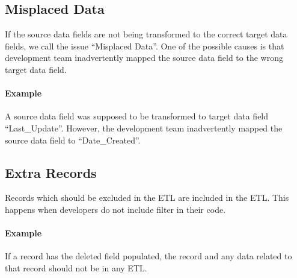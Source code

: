 
\subsection*{Misplaced Data}

If the source data fields are not being transformed to the correct target data fields, we call the issue \enquote{Misplaced Data}.
One of the possible causes is that development team inadvertently mapped the source data field to the wrong target data field.

\paragraph*{Example} A source data field was supposed to be transformed to target data field \enquote{Last\_Update}.
However, the development team inadvertently mapped the source data field to \enquote{Date\_Created}.


\subsection*{Extra Records}

Records which should be excluded in the ETL are included in the ETL.
This happens when developers do not include filter in their code.

\paragraph*{Example} If a record has the deleted field populated, the record and any data related to that record should not be in any ETL.



